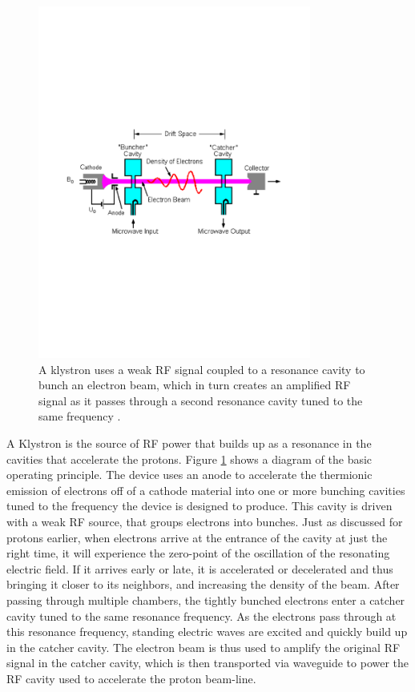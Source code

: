 \begin{figure}[h]
   \centering
  \includegraphics[width=0.8\textwidth]{Figures/LHC_Diagrams/LHC_KlystronBasic.pdf}
  \caption{A klystron uses a weak RF signal coupled to a resonance
    cavity to bunch an electron beam, which in turn creates an
    amplified RF signal as it passes through a second resonance cavity
    tuned to the same frequency \cite{LHC:LHC_klyston_basic}.} \label{fig:lhc_klystron_operation}
\end{figure}

\par A Klystron is the source of RF power that builds up as a
resonance in the cavities that accelerate the protons.  Figure
\ref{fig:lhc_klystron_operation} shows a diagram of the basic
operating principle.  The device uses an anode to accelerate the
thermionic emission of electrons off of a cathode material into one or
more bunching cavities tuned to the frequency the device is designed
to produce.  This cavity is driven with a weak RF source, that groups
electrons into bunches.  Just as discussed for protons earlier, when
electrons arrive at the entrance of the cavity at just the right time,
it will experience the zero-point of the oscillation of the resonating
electric field.  If it arrives early or late, it is accelerated or
decelerated and thus bringing it closer to its neighbors, and
increasing the density of the beam.  After passing through multiple
chambers, the tightly bunched electrons enter a catcher cavity tuned
to the same resonance frequency.  As the electrons pass through at
this resonance frequency, standing electric waves are excited and
quickly build up in the catcher cavity.  The electron beam is thus
used to amplify the original RF signal in the catcher cavity, which is
then transported via waveguide to power the RF cavity used to
accelerate the proton beam-line.  

